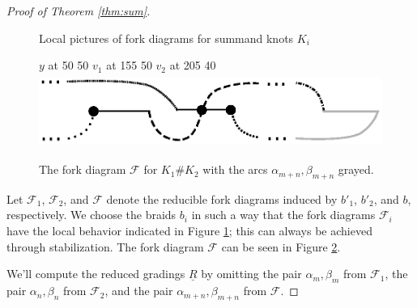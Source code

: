 \documentclass[11pt]{article}
\theoremstyle{plain} \newtheorem{thm}{Theorem}[subsection]
\theoremstyle{plain} \newtheorem{cor}[thm]{Corollary}
\theoremstyle{plain} \newtheorem{prop}[thm]{Proposition}
\theoremstyle{plain} \newtheorem{conj}[thm]{Conjecture}
\theoremstyle{plain} \newtheorem{lem}[thm]{Lemma}
\theoremstyle{definition} \newtheorem{df}[thm]{Definition}
\theoremstyle{remark} \newtheorem{rmk}[thm]{Remark}
\theoremstyle{remark} \newtheorem{obs}[thm]{Observation}
\newcommand{\red}[1]{\underline{#1}}
\numberwithin{equation}{section}
\begin{document}
\begin{proof}[Proof of Theorem \ref{thm:sum}]
\begin{figure}[h]
\centering
{}\qquad
{}
\caption{Local pictures of fork diagrams for summand knots $K_{i}$}
\label{fig:csflat1}
\end{figure}

\begin{figure}
\centering
{}
\small
\pinlabel* $y$ at 50 50
\pinlabel* $v_{1}$ at 155 50
\pinlabel* $v_{2}$ at 205 40
\endlabellist
\includegraphics[height = 24mm]{CSF}
\caption[Local picture of the fork diagram for $K_{1} \# K_{2}$]{The fork diagram $\mathcal{F}$ for $K_{1} \# K_{2}$ with the arcs $\alpha_{m+n}, \beta_{m+n}$ grayed.}
\label{fig:csflat2}
\end{figure}

Let $\mathcal{F}_{1}$, $\mathcal{F}_{2}$, and $\mathcal{F}$ denote the reducible fork diagrams induced by $b'_{1}$, $b'_{2}$, and $b$, respectively.  We choose the braids $b_{i}$ in such a way that the fork diagrams $\mathcal{F}_{i}$ have the local behavior indicated in Figure \ref{fig:csflat1};  this can always be achieved through stabilization.  The fork diagram $\mathcal{F}$ can be seen in Figure \ref{fig:csflat2}.

We'll compute the reduced gradings $\red{R}$ by omitting the pair $\alpha_{m}, \beta_{m}$ from $\mathcal{F}_{1}$, the pair $\alpha_{n}, \beta_{n}$ from $\mathcal{F}_{2}$, and the pair $\alpha_{m+n}, \beta_{m+n}$ from $\mathcal{F}$.


\end{proof}
\end{document}
